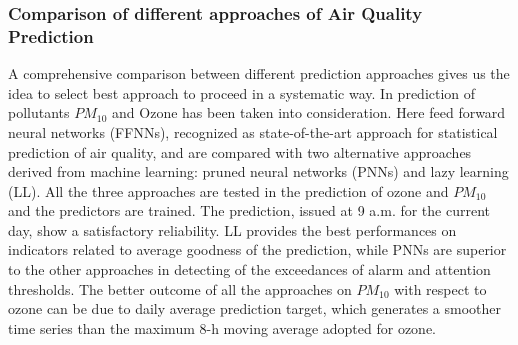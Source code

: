 \subsubsection{Comparison of different approaches of Air Quality Prediction}
A comprehensive comparison between different prediction approaches gives us the idea to select best approach to proceed in a systematic way. In prediction of pollutants $PM_{10}$ and Ozone has been taken into consideration. Here feed forward neural networks (FFNNs), recognized as state-of-the-art approach for statistical prediction of air quality, and are compared with two alternative approaches derived from machine learning: pruned neural networks (PNNs) and lazy learning (LL). All the three approaches are tested in the prediction of ozone and $PM_{10}$ and the predictors are trained. The prediction, issued at 9 a.m. for the current day, show a satisfactory reliability. LL provides the best performances on indicators related to average goodness of the prediction, while PNNs are superior to the other approaches in detecting of the exceedances of alarm and attention thresholds. The better outcome of all the approaches on $PM_{10}$ with respect to ozone can be due to daily average prediction target, which generates a smoother time series than the maximum 8-h moving average adopted for ozone.

